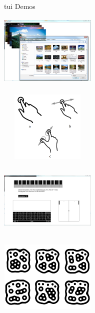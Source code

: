 \begin{frame}%
\begin{block}{tui Demos}
\begin{minipage}{1.0\linewidth}
\begin{center}
\begin{minipage}{.49\linewidth}
\begin{center}
\includegraphics[height=34mm, width=46mm]{images/image_app.png}\\$\;$\\
\includegraphics[height=34mm, width=46mm]{images/touch.png}
\end{center}
\end{minipage}%
\begin{minipage}{.49\linewidth}
\begin{center}
\includegraphics[height=34mm, width=46mm]{images/fiducials.png}\\$\;$\\
\includegraphics[height=34mm, width=46mm]{images/fiducial_markers.png} 
\end{center}
\end{minipage}
\end{center}
\end{minipage}
\end{block}
\end{frame}


